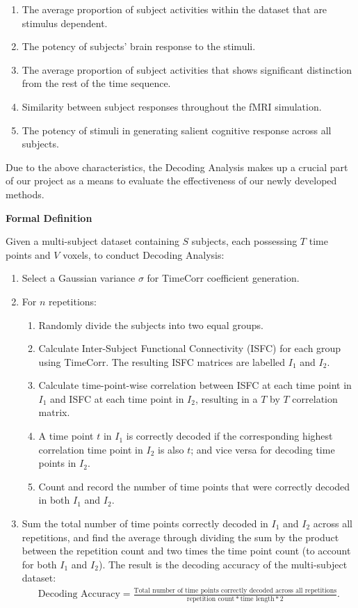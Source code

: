 \documentclass[11pt]{article}
\begin{document}
\begin{enumerate}
\begin{enumerate}
\item The average proportion of subject activities within the dataset that are stimulus dependent.
\item The potency of subjects' brain response to the stimuli.
\item The average proportion of subject activities that shows significant distinction from the rest of the time sequence.
\item Similarity between subject responses throughout the fMRI simulation.
\item The potency of stimuli in generating salient cognitive response across all subjects.
\end{enumerate}

Due to the above characteristics, the Decoding Analysis makes up a crucial part of our project as a means to evaluate the effectiveness of our newly developed methods.

\large{\textbf{Formal Definition}}

\normalsize
Given a multi-subject dataset containing $S$ subjects, each possessing $T$ time points and $V$ voxels, to conduct Decoding Analysis:
\begin{enumerate}
\item Select a Gaussian variance $\sigma$ for TimeCorr coefficient generation.
\item For $n$ repetitions:
\begin{enumerate}
\item Randomly divide the subjects into two equal groups.
\item Calculate Inter-Subject Functional Connectivity (ISFC) for each group using TimeCorr. The resulting ISFC matrices are labelled $I_1$ and $I_2$.
\item Calculate time-point-wise correlation between ISFC at each time point in $I_1$ and ISFC at each time point in $I_2$, resulting in a $T$ by $T$ correlation matrix.
\item A time point $t$ in $I_1$ is correctly decoded if the corresponding highest correlation time point in $I_2$ is also $t$; and vice versa for decoding time points in $I_2$.
\item Count and record the number of time points that were correctly decoded in both $I_1$ and $I_2$.
\end{enumerate}
\item Sum the total number of time points correctly decoded in $I_1$ and $I_2$ across all repetitions, and find the average through dividing the sum by the product between the repetition count and two times the time point count (to account for both $I_1$ and $I_2$). The result is the decoding accuracy of the multi-subject dataset:
\begin{align*}
\text{Decoding Accuracy} = \frac{\text{Total number of time points correctly decoded across all repetitions}}{\text{repetition count} * \text{time length} * 2}.
\end{align*}
\end{enumerate}





\end{enumerate}
\end{document}
